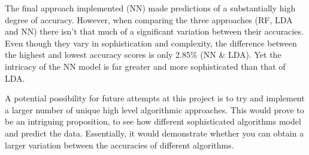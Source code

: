 \documentclass{article}
\begin{document}
The final approach implemented (NN) made predictions of a substantially high degree of accuracy. However, when comparing the three approaches (RF, LDA and NN)  there isn't that much of a significant variation between their accuracies. Even though they vary in sophistication and complexity, the difference between the highest and lowest accuracy scores is only 2.85\% (NN \& LDA). Yet the intricacy of the NN model is far greater and more sophisticated than that of LDA. 

A potential possibility for future attempts at this project is to try and implement a larger number of unique high level algorithmic approaches. This would prove to be an intriguing proposition, to see how different sophisticated algorithms model and predict the data. Essentially, it would demonstrate whether you can obtain a larger variation between the accuracies of different algorithms. 


  
\end{document}
